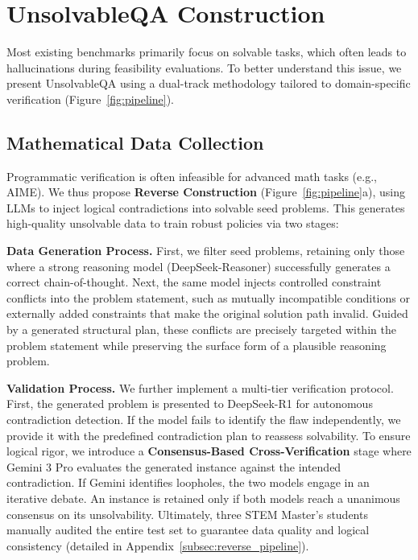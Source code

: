 \section{UnsolvableQA Construction}
\label{sec:dataset}

Most existing benchmarks primarily focus on solvable tasks, which often leads to hallucinations during feasibility evaluations. To better understand this issue,  we present UnsolvableQA using a dual-track methodology tailored to domain-specific verification (Figure~\ref{fig:pipeline}).

\subsection{Mathematical Data Collection}
\label{sec:math_gen}

Programmatic verification is often infeasible for advanced math tasks (e.g., AIME). We thus propose \textbf{Reverse Construction} (Figure~\ref{fig:pipeline}a), using LLMs to inject logical contradictions into solvable seed problems. This generates high-quality unsolvable data to train robust policies via two stages:

\vspace{0.3em}
\noindent\textbf{Data Generation Process.}
First, we filter seed problems, retaining only those where a strong reasoning model (DeepSeek-Reasoner) successfully generates a correct chain-of-thought. Next, the same model injects controlled constraint conflicts into the problem statement, such as mutually incompatible conditions or externally added constraints that make the original solution path invalid. Guided by a generated structural plan, these conflicts are precisely targeted within the problem statement while preserving the surface form of a plausible reasoning problem.

\vspace{0.3em}
\noindent\textbf{Validation Process.}
We further implement a multi-tier verification protocol. First, the generated problem is presented to DeepSeek-R1 for autonomous contradiction detection. If the model fails to identify the flaw independently, we provide it with the predefined contradiction plan to reassess solvability.
To ensure logical rigor, we introduce a \textbf{Consensus-Based Cross-Verification} stage where Gemini 3 Pro evaluates the generated instance against the intended contradiction. If Gemini identifies loopholes, the two models engage in an iterative debate. An instance is retained only if both models reach a unanimous consensus on its unsolvability. Ultimately, three STEM Master's students manually audited the entire test set to guarantee data quality and logical consistency (detailed in Appendix~\ref{subsec:reverse_pipeline}).




